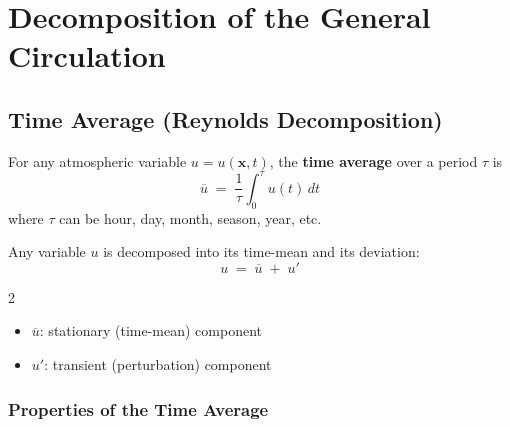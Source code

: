 
\section{Decomposition of the General Circulation}\label{sec:decomposition}

\subsection{Time Average (Reynolds Decomposition)}

\begin{definition}

  For any atmospheric variable $u = u(\mathbf{x}, t)$, the \textbf{time average} over
  a period $\tau$ is
  \begin{equation}\label{eq:time-avg}
    \overline{u} \;=\; \frac{1}{\tau}\int_0^{\tau} u(t)\,dt
  \end{equation}
  where $\tau$ can be hour, day, month, season, year, etc.
\end{definition}

\begin{definition}

  Any variable $u$ is decomposed into its time-mean and its deviation:
  \begin{equation}\label{eq:reynolds}
    u \;=\; \overline{u} \;+\; u'
  \end{equation}
  \begin{multicols}{2}
  \begin{itemize}
    \item $\overline{u}$: stationary (time-mean) component
    \item $u'$: transient (perturbation) component
  \end{itemize}
  \end{multicols}
\end{definition}

\subsubsection{Properties of the Time Average}

